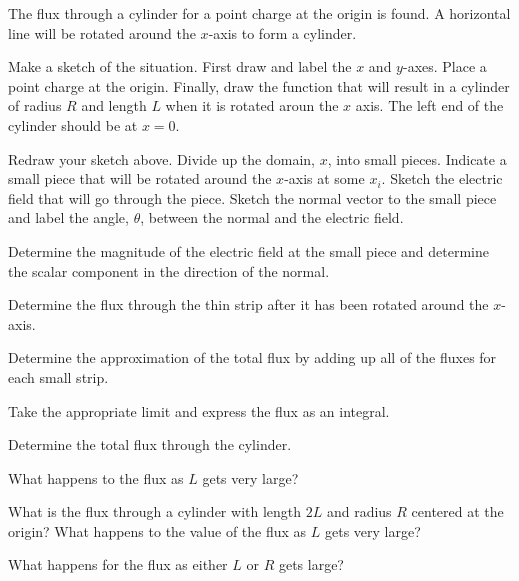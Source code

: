 

\begin{problem}
\item The flux through a cylinder for a point charge at the origin is found.
A horizontal line will be rotated around the $x$-axis to form a cylinder.
  \begin{subproblem}
    \item Make a sketch of the situation. First draw and label the $x$ and $y$-axes.
    Place a point charge at the origin.
    Finally, draw the function that will result in a cylinder of radius $R$ and length $L$ when it is rotated aroun the $x$ axis.
    The left end of the cylinder should be at $x=0$.
    \vfill

    \item Redraw your sketch above. Divide up the domain, $x$, into small pieces.
    Indicate a small piece that will be rotated around the $x$-axis at some $x_i$.
    Sketch the electric field that will go through the piece.
    Sketch the normal vector to the small piece and label the angle, $\theta$, between the normal and the electric field.
    \vfill

    \item  Determine the magnitude of the  electric field at the small piece and determine the scalar component in the direction of the normal.
    \vfill

    \clearpage

    \item Determine the flux through the thin strip after it has been rotated around the $x$-axis.
      \vfill

    \item Determine the approximation of the total flux by adding up all of the fluxes for each small strip.
      \vfill

    \item Take the appropriate limit and express the flux as an integral.
      \vfill

      \clearpage

    \item Determine the total flux through the cylinder.
      \vfill

    \clearpage

    \item What happens to the flux as $L$ gets very large?
      \vfill

    \item What is the flux through a cylinder with length $2L$ and radius $R$ centered at the origin? What happens to the value of the flux as $L$ gets very large?
      \vfill
      \vfill
      \vfill
      \vfill

    \item  What happens for the flux as either $L$ or $R$ gets large?
      \vfill

  \end{subproblem}
\end{problem}


